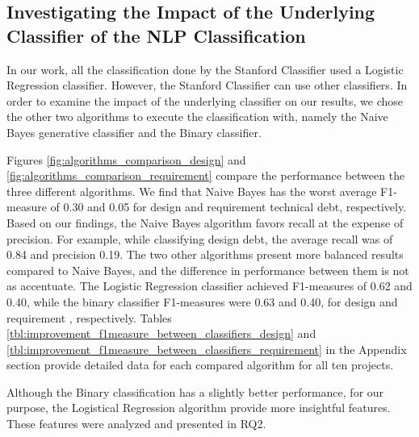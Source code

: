 \subsection{Investigating the Impact of the Underlying Classifier of the NLP Classification}
\label{sec:underlying_classifier}
In our work, all the classification done by the Stanford Classifier used a Logistic Regression classifier. However, the Stanford Classifier can use other classifiers. In order to examine the impact of the underlying classifier on our results, we chose the other two algorithms to execute the classification with, namely the Naive Bayes generative classifier and the Binary classifier.

Figures \ref{fig:algorithms_comparison_design} and \ref{fig:algorithms_comparison_requirement} compare the performance between the three different algorithms. We find that Naive Bayes has the worst average F1-measure of 0.30 and 0.05 for design and requirement technical debt, respectively. Based on our findings, the Naive Bayes algorithm favors recall at the expense of precision. For example, while classifying design debt, the average recall was of 0.84 and precision 0.19. The two other algorithms present more balanced results compared to Naive Bayes, and the difference in performance between them is not as accentuate. The Logistic Regression classifier achieved F1-measures of 0.62 and 0.40, while the binary classifier F1-measures were 0.63 and 0.40, for design and requirement \SATD, respectively. Tables \ref{tbl:improvement_f1measure_between_classifiers_design} and \ref{tbl:improvement_f1measure_between_classifiers_requirement} in the Appendix section provide detailed data for each compared algorithm for all ten projects.

Although the Binary classification has a slightly better performance, for our purpose, the Logistical Regression algorithm provide more insightful features. These features were analyzed and presented in RQ2. 
